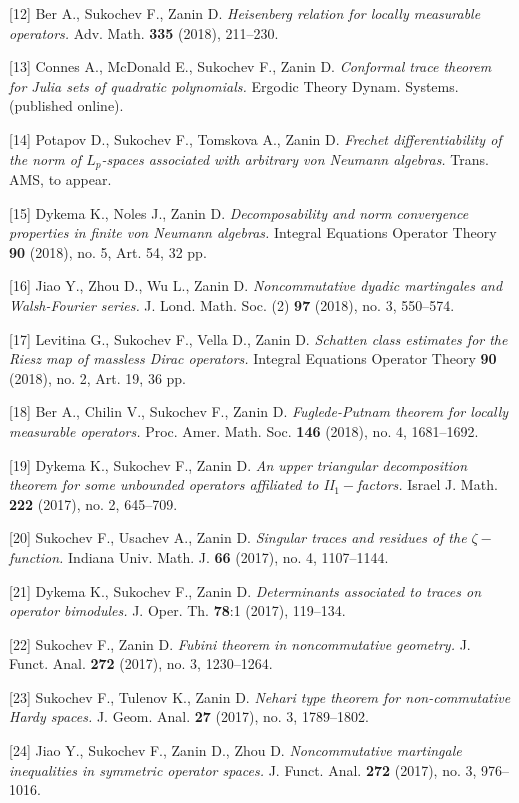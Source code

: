 \documentclass{article}
\begin{document}
[12] Ber A., Sukochev F., Zanin D. {\it Heisenberg relation for locally measurable operators.} Adv. Math. {\bf 335} (2018), 211--230.

[13] Connes A., McDonald E., Sukochev F., Zanin D. {\it Conformal trace theorem for Julia sets of quadratic polynomials.} Ergodic Theory Dynam. Systems. (published online).

[14] Potapov D., Sukochev F., Tomskova A., Zanin D. {\it Frechet differentiability of the norm of $L_p$-spaces associated with arbitrary von Neumann algebras.} Trans. AMS, to appear.

[15] Dykema K., Noles J., Zanin D. {\it Decomposability and norm convergence properties in finite von Neumann algebras.} Integral Equations Operator Theory {\bf 90} (2018), no. 5, Art. 54, 32 pp.

[16] Jiao Y., Zhou D., Wu L., Zanin D. {\it Noncommutative dyadic martingales and Walsh-Fourier series.} J. Lond. Math. Soc. (2) {\bf 97} (2018), no. 3, 550--574.

[17] Levitina G., Sukochev F., Vella D., Zanin D. {\it Schatten class estimates for the Riesz map of massless Dirac operators.} Integral Equations Operator Theory {\bf 90} (2018), no. 2, Art. 19, 36 pp.

[18] Ber A., Chilin V., Sukochev F., Zanin D. {\it Fuglede-Putnam theorem for locally measurable operators.} Proc. Amer. Math. Soc. {\bf 146} (2018), no. 4, 1681--1692.

[19] Dykema K., Sukochev F., Zanin D. {\it An upper triangular decomposition theorem for some unbounded operators affiliated to II$_1-$factors.} Israel J. Math. {\bf 222} (2017), no. 2, 645--709.

[20] Sukochev F., Usachev A., Zanin D. {\it Singular traces and residues of the $\zeta-$function.} Indiana Univ. Math. J. {\bf 66} (2017), no. 4, 1107--1144.

[21] Dykema K., Sukochev F., Zanin D. {\it Determinants associated to traces on operator bimodules.} J. Oper. Th. {\bf 78}:1 (2017), 119--134.

[22] Sukochev F., Zanin D. {\it Fubini theorem in noncommutative geometry.} J. Funct. Anal. {\bf 272} (2017), no. 3, 1230--1264.

[23] Sukochev F., Tulenov K., Zanin D. {\it Nehari type theorem for non-commutative Hardy spaces.} J. Geom. Anal. {\bf 27} (2017), no. 3, 1789--1802.

[24] Jiao Y., Sukochev F., Zanin D., Zhou D. {\it Noncommutative martingale inequalities in symmetric operator spaces.} J. Funct. Anal. {\bf 272} (2017), no. 3, 976--1016.
\end{document}
